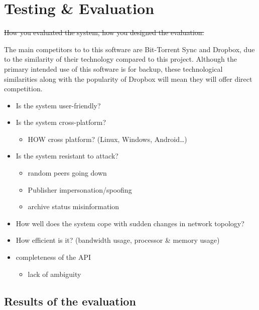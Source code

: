 \documentclass[12pt,a4paper,]{adreport}
\begin{document}
\chapter{Testing \& Evaluation}\label{testing-evaluation}

\sout{How you evaluated the system, how you designed the evaluation.}

The main competitors to to this software are Bit-Torrent Sync and
Dropbox, due to the similarity of their technology compared to this
project. Although the primary intended use of this software is for
backup, these technological similarities along with the popularity of
Dropbox will mean they will offer direct competition.

\begin{itemize}
\itemsep1pt\parskip0pt
\item
  Is the system user-friendly?
\item
  Is the system cross-platform?

  \begin{itemize}
  \itemsep1pt\parskip0pt
  \item
    HOW cross platform? (Linux, Windows, Android\ldots{})
  \end{itemize}
\item
  Is the system resistant to attack?

  \begin{itemize}
  \itemsep1pt\parskip0pt
  \item
    random peers going down
  \item
    Publisher impersonation/spoofing
  \item
    archive status misinformation
  \end{itemize}
\item
  How well does the system cope with sudden changes in network topology?
\item
  How efficient is it? (bandwidth usage, processor \& memory usage)
\item
  completeness of the API

  \begin{itemize}
  \itemsep1pt\parskip0pt
  \item
    lack of ambiguity
  \end{itemize}
\end{itemize}

\section{Results of the evaluation}\label{results-of-the-evaluation}
\end{document}
